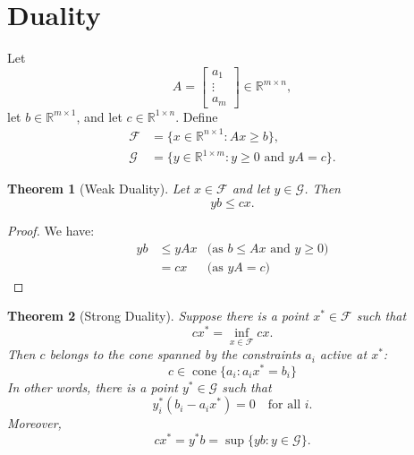 \documentclass[12pt]{amsart}
\newtheorem{theorem}{Theorem}[section]
\theoremstyle{definition}
\theoremstyle{remark}
\numberwithin{equation}{section}
\newcommand{\RR}{\mathbb{R}}
\newcommand{\cF}{\mathcal{F}}
\newcommand{\cG}{\mathcal{G}}
\DeclareMathOperator{\cone}{cone}
\begin{document}
\section{Duality}

Let
\[
    A=\begin{bmatrix}a_1\\\vdots\\a_m\end{bmatrix}\in\RR^{m\times n},
\]
let $b\in\RR^{m\times 1}$, and let $c\in\RR^{1\times n}$.
Define
\begin{align*}
    \cF &= \{x\in \RR^{n\times 1}: Ax\geq b\},\\
    \cG &= \{y\in\RR^{1\times m}: \text{$y\geq 0$ and $yA=c$}\}.
\end{align*}




\begin{theorem}[Weak Duality]
    Let $x\in\cF$ and let $y\in \cG$. Then
    \[
        yb\leq cx.
    \]
\end{theorem}

\begin{proof}
    We have:
    \begin{align*}
    yb &\leq yAx&\text{(as $b\leq Ax$ and $y\geq 0$)}\\
    &= cx&\text{(as $yA=c$)}
    \end{align*}
\end{proof}


\begin{theorem}[Strong Duality]
    Suppose there is a point $x^*\in\cF$ such that
    \[
        cx^* = \inf_{x\in\cF}cx.
    \]
    Then $c$ belongs to the cone spanned by the constraints $a_i$ active at $x^*$:
    \[
        c\in \cone\{a_i : a_ix^* = b_i\}
    \]
    In other words, there is a point $y^*\in\cG$ such that
    \[
        y_i^*(b_i-a_ix^*)=0\quad\text{for all $i$}.
    \]
    Moreover,
    \[
        cx^* = y^*b = \sup\{yb : y\in\cG\}.
    \]
\end{theorem}
\end{document}
